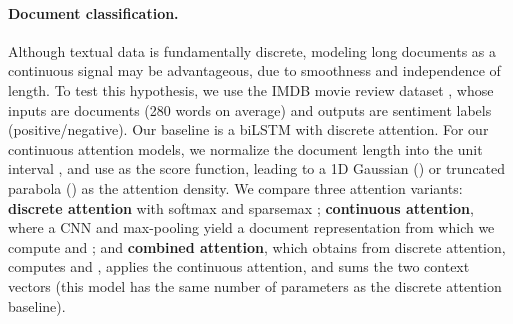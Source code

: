 \documentclass{article}
\begin{document}
\paragraph{Document classification.} 

Although textual data is fundamentally discrete, modeling long documents as a continuous signal may be advantageous, due to smoothness and independence of length. To test this hypothesis, we use the IMDB movie review dataset \citep{maas2011learning}, 
whose inputs are documents (280 words on average) and  outputs are sentiment labels (positive/negative). Our baseline is a biLSTM with discrete attention. 
For our continuous attention models, we normalize the document length  into the unit interval , and use  as the score function, leading to a 1D Gaussian () or  truncated parabola () as the attention density.  We compare three attention variants: 
{\bf discrete attention} with softmax \citep{bahdanau2014neural} and sparsemax \citep{Martins2016ICML};  
{\bf continuous attention},  
where a CNN and max-pooling  
yield a document representation  from which 
we compute  and ;   
and {\bf combined attention}, which obtains  from discrete attention, computes  and , applies the continuous attention, and sums the two context vectors (this model has the same number of parameters as the discrete attention baseline). 
\end{document}
